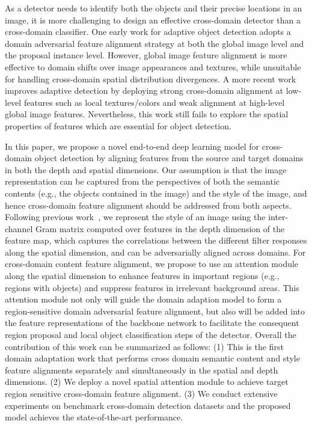 \documentclass[runningheads]{llncs}
\begin{document}
As a detector needs to identify both the objects and their precise locations in an image, 
it is more challenging to design an effective cross-domain detector than a cross-domain classifier.
One early work for adaptive object detection 
\cite{chen2018domain} adopts a domain adversarial feature alignment strategy at both
the global image level and the proposal instance level. 
However, 
global image feature alignment is more effective to domain shifts over image appearances and textures,
while unsuitable for handling cross-domain spatial distribution divergences. 
A more recent work~\cite{saito2019strong} improves adaptive detection
by deploying strong cross-domain alignment at low-level features such as local textures/colors
and weak alignment at high-level global image features.
Nevertheless, this work still fails to explore the spatial properties of features 
which are essential for object detection.


In this paper, we propose a novel end-to-end deep learning model for 
cross-domain object detection by aligning features from the source and target domains
in both the depth and spatial dimensions. 
Our assumption is that the image representation can be captured from the perspectives of
both the semantic contents (e.g., the objects contained in the image) and the style of the image,
and hence cross-domain feature alignment should be addressed from both aspects.
Following previous work~\cite{Gatys2016Image}, we represent the style of an image
using the inter-channel Gram matrix computed over features in the depth dimension of the feature map,
which captures the correlations between the different filter responses along the spatial dimension,
and can be adversarially aligned across domains.
For cross-domain content feature alignment, we propose to use an attention module 
along the spatial dimension
to enhance features in important regions (e.g., regions with objects)
and suppress features in irrelevant background areas. 
This attention module not only will guide the domain adaption model to form 
a region-sensitive domain adversarial feature alignment, 
but also will be added into the feature representations 
of the backbone network to facilitate the consequent region proposal and local object classification steps of the detector.
Overall the contribution of this work can be summarized as follows:
(1) This is the first domain adaptation work that performs cross domain 
semantic content and style feature alignments separately and simultaneously 
in the spatial and depth dimensions. 
(2) We deploy a novel spatial attention module to achieve target region sensitive cross-domain feature alignment.
(3) We conduct extensive experiments on benchmark cross-domain detection datasets and
the proposed model achieves the state-of-the-art performance.
\end{document}
